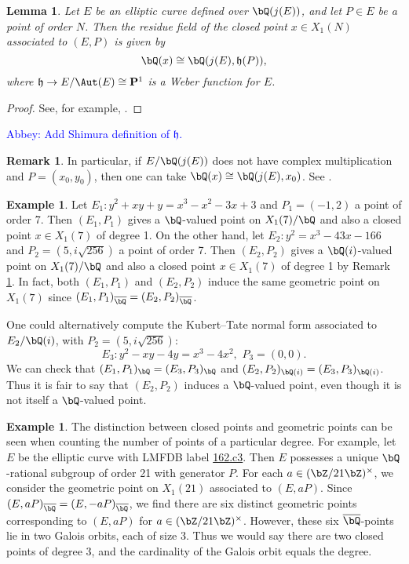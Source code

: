 \documentclass[11pt,reqno]{amsart}
\theoremstyle{plain}
\newtheorem{lemma}[theorem]{Lemma}
\theoremstyle{definition}
\newtheorem{remark}[theorem]{Remark}
\newtheorem{example}[theorem]{Example}
\newcommand{\Q}{\bQ}
\newcommand{\Z}{\bZ}
\newcommand{\abbey}[1]{\textcolor{blue}{Abbey: #1}}
\newcommand{\abedit}[1]{{\color{blue} #1}}
\begin{document}
\begin{lemma}\label{ResidueFieldLemma}
Let $E$ be an elliptic curve defined over $\Q(j(E))$, and let $P \in E$ be a point of order $N$. Then the residue field of the closed point $x \in X_1(N)$ associated to $(E,P)$ is given by
\[
\Q(x)\cong\Q(j(E),\mathfrak{h}(P)),
\]
where $\mathfrak{h} \rightarrow E/\Aut(E) \cong \mathbf{P}^1$ is a Weber function for $E$. 
\end{lemma}

\begin{proof}
See, for example, \cite[Lemma 2.5]{BourdonNajman2021}.%
\end{proof}

\abbey{Add Shimura definition of $\mathfrak{h}$.}

\begin{remark}\label{ResidueFieldRmk} In particular, if $E/\Q(j(E))$ does not have complex multiplication and $P=(x_0,y_0)$, then one can take $\Q(x)\cong\Q(j(E),x_0)$. See \cite[p. 107]{shimura}.
\end{remark}
\begin{example}
Let $E_1:y^2+xy+y=x^3-x^2-3x+3$ and $P_1=(-1,2)$ a point of order 7. Then $(E_1,P_1)$ gives a $\Q$-valued point on $X_1(7)/\Q$ and also a closed point $x\in X_1(7)$ of degree 1. On the other hand, let $E_2:y^2=x^3-43x-166$ and $P_2=(5,i\sqrt{256})$ a point of order 7. Then $(E_2,P_2)$ gives a $\Q(i)$-valued point on $X_1(7)/\Q$ and also a closed point $x\in X_1(7)$ of degree 1 by \abedit{Remark \ref{ResidueFieldRmk}}. In fact, both $(E_1,P_1)$ and $(E_2,P_2)$ induce the same geometric point on $X_1(7)$ since $(E_1,P_1)_{\overline{\Q}}=(E_2,P_2)_{\overline{\Q}}$. 

One could alternatively compute the Kubert--Tate normal form associated to $E_2/\Q(i)$, with $P_2=(5,i\sqrt{256})$:
\[E_3: y^2-xy-4y=x^3-4x^2,\, \, P_3=(0,0).
\]
We can check that $(E_1,P_1)_{\Q}=(E_3,P_3)_{\Q}$ and $(E_2,P_2)_{\Q(i)} =(E_3,P_3)_{\Q(i)}$. Thus it is fair to say that $(E_2,P_2)$ induces a $\Q$-valued point, even though it is not itself a $\Q$-valued point. 
\end{example}

\begin{example}
The distinction between closed points and geometric points can be seen when counting the number of points of a particular degree. For example, let $E$ be the elliptic curve with LMFDB label \href{https://www.lmfdb.org/EllipticCurve/Q/162/c/3}{162.c3}. Then $E$ possesses a unique $\Q$-rational subgroup of order 21 with generator $P$. For each $a \in (\Z/21\Z)^{\times}$, we consider the geometric point on $X_1(21)$ associated to $(E,aP)$. Since $(E,aP)_{\overline{\Q}}=(E,-aP)_{\overline{\Q}}$, we find there are six distinct geometric points corresponding to $(E,aP)$ for $a \in (\Z/21\Z)^{\times}$. However, these six $\overline{\Q}$-points lie in two Galois orbits, each of size 3. Thus we would say there are two closed points of degree 3, and the cardinality of the Galois orbit equals the degree.
\end{example}
\end{document}
